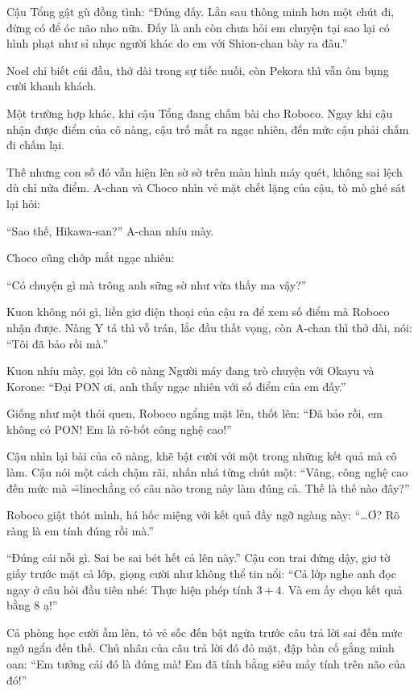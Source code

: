 \documentclass[../main.tex]{subfiles}
\begin{document}
Cậu Tổng gật gù đồng tình: ``Đúng đấy. Lần sau thông minh hơn một chút đi, đừng có để óc não nho nữa. Đấy là anh còn chưa hỏi em chuyện tại sao lại có hình phạt như sỉ nhục người khác do em với Shion-chan bày ra đâu.''

Noel chỉ biết cúi đầu, thở dài trong sự tiếc nuối, còn Pekora thì vẫn ôm bụng cười khanh khách.

\ct

Một trường hợp khác, khi cậu Tổng đang chấm bài cho Roboco. Ngay khi cậu nhận được điểm của cô nàng, cậu trố mắt ra ngạc nhiên, đến mức cậu phải chấm đi chấm lại.

Thế nhưng con số đó vẫn hiện lên sờ sờ trên màn hình máy quét, không sai lệch dù chỉ nửa điểm. A-chan và Choco nhìn vẻ mặt chết lặng của cậu, tò mò ghé sát lại hỏi:

``Sao thế, Hikawa-san?'' A-chan nhíu mày.

Choco cũng chớp mắt ngạc nhiên:

``Có chuyện gì mà trông anh sững sờ như vừa thấy ma vậy?''

Kuon không nói gì, liền giơ điện thoại của cậu ra để xem số điểm mà Roboco nhận được. Nàng Y tá thì vỗ trán, lắc đầu thất vọng, còn A-chan thì thở dài, nói: ``Tôi đã bảo rồi mà.''

Kuon nhíu mày, gọi lớn cô nàng Người máy đang trò chuyện với Okayu và Korone: ``Đại PON ơi, anh thấy ngạc nhiên với số điểm của em đấy.''

Giống như một thói quen, Roboco ngẩng mặt lên, thốt lên: ``Đã bảo rồi, em không có PON! Em là rô-bốt công nghệ cao!''

Cậu nhìn lại bài của cô nàng, khẽ bật cười với một trong những kết quả mà cô làm. Cậu nói một cách chậm rãi, nhấn nhá từng chút một: ``Vâng, công nghệ cao đến mức mà \u=line{chẳng có câu nào} trong này làm đúng cả. Thế là thế nào đây?''

Roboco giật thót mình, há hốc miệng với kết quả đầy ngỡ ngàng này: ``\dots Ơ? Rõ ràng là em tính đúng rồi mà.''

``Đúng cái nỗi gì. Sai be sai bét hết cả lên này.'' Cậu con trai đứng dậy, giơ tờ giấy trước mặt cả lớp, giọng cười như không thể tin nổi: ``Cả lớp nghe anh đọc ngay ở câu hỏi đầu tiên nhé: Thực hiện phép tính \(3 + 4\). Và em ấy chọn kết quả bằng 8 ạ!''

Cả phòng học cười ầm lên, tỏ vẻ sốc đến bật ngửa trước câu trả lời sai đến mức ngớ ngẩn đến thế. Chủ nhân của câu trả lời đó đỏ mặt, đập bàn cố gắng minh oan: ``Em tưởng cái đó là đúng mà! Em đã tính bằng siêu máy tính trên não của đó!''
\end{document}
